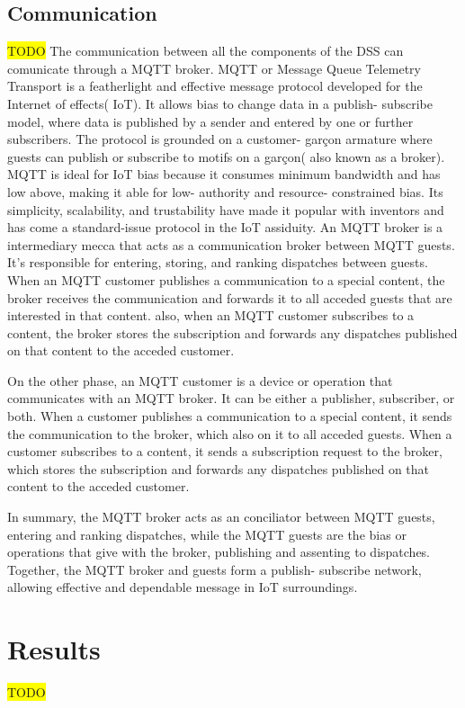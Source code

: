 \documentclass[journal,article,submit,pdftex,moreauthors]{Definitions/mdpi}
\begin{document}
\subsection{Communication}
\colorbox{yellow}{TODO}
The communication between all the components of the DSS can comunicate through a MQTT broker.
MQTT or Message Queue Telemetry Transport is a featherlight and effective message protocol developed for the Internet of effects( IoT). 
It allows bias to change data in a publish- subscribe model, where data is published by a sender and entered by one or further subscribers. The protocol is grounded on a customer- garçon armature where guests can publish or subscribe to motifs on a garçon( also known as a broker). MQTT is ideal for IoT bias because it consumes minimum bandwidth and has low above, making it able for low- authority and resource- constrained bias. 
Its simplicity, scalability, and trustability have made it popular with inventors and has come a standard-issue protocol in the IoT assiduity.
An MQTT broker is a intermediary mecca that acts as a communication broker between MQTT guests. It's responsible for entering, storing, and ranking dispatches between guests. When an MQTT customer publishes a communication to a special content, the broker receives the communication and forwards it to all acceded guests that are interested in that content. also, when an MQTT customer subscribes to a content, the broker stores the subscription and forwards any dispatches published on that content to the acceded customer.

On the other phase, an MQTT customer is a device or operation that communicates with an MQTT broker. It can be either a publisher, subscriber, or both. When a customer publishes a communication to a special content, it sends the communication to the broker, which also on it to all acceded guests. When a customer subscribes to a content, it sends a subscription request to the broker, which stores the subscription and forwards any dispatches published on that content to the acceded customer.

In summary, the MQTT broker acts as an conciliator between MQTT guests, entering and ranking dispatches, while the MQTT guests are the bias or operations that give with the broker, publishing and assenting to dispatches. Together, the MQTT broker and guests form a publish- subscribe network, allowing effective and dependable message in IoT surroundings.


\section{Results}
\colorbox{yellow}{TODO}
\end{document}
